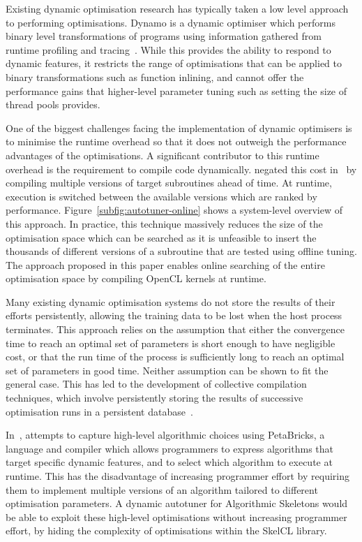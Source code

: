 Existing dynamic optimisation research has typically taken a low level
approach to performing optimisations. Dynamo is a dynamic optimiser
which performs binary level transformations of programs using
information gathered from runtime profiling and
tracing~\cite{Bala2000}. While this provides the ability to respond to
dynamic features, it restricts the range of optimisations that can be
applied to binary transformations such as function inlining, and
cannot offer the performance gains that higher-level parameter tuning
such as setting the size of thread pools provides.

One of the biggest challenges facing the implementation of dynamic
optimisers is to minimise the runtime overhead so that it does not
outweigh the performance advantages of the optimisations. A
significant contributor to this runtime overhead is the requirement to
compile code dynamically. \citeauthor{Fursin2005} negated this cost
in~\cite{Fursin2005} by compiling multiple versions of target
subroutines ahead of time. At runtime, execution is switched between
the available versions which are ranked by
performance. Figure~\ref{subfig:autotuner-online} shows a system-level
overview of this approach. In practice, this technique massively
reduces the size of the optimisation space which can be searched as it
is unfeasible to insert the thousands of different versions of a
subroutine that are tested using offline tuning. The approach proposed
in this paper enables online searching of the entire optimisation
space by compiling OpenCL kernels at runtime.

Many existing dynamic optimisation systems do not store the results of
their efforts persistently, allowing the training data to be lost when
the host process terminates. This approach relies on the assumption
that either the convergence time to reach an optimal set of parameters
is short enough to have negligible cost, or that the run time of the
process is sufficiently long to reach an optimal set of parameters in
good time. Neither assumption can be shown to fit the general
case. This has led to the development of collective compilation
techniques, which involve persistently storing the results of
successive optimisation runs in a persistent
database~\cite{Fursin2010}.

In~\cite{Ansel2009a}, \citeauthor{Ansel2009a} attempts to capture
high-level algorithmic choices using PetaBricks, a language and
compiler which allows programmers to express algorithms that target
specific dynamic features, and to select which algorithm to execute at
runtime. This has the disadvantage of increasing programmer effort by
requiring them to implement multiple versions of an algorithm tailored
to different optimisation parameters. A dynamic autotuner for
Algorithmic Skeletons would be able to exploit these high-level
optimisations without increasing programmer effort, by hiding the
complexity of optimisations within the SkelCL library.

